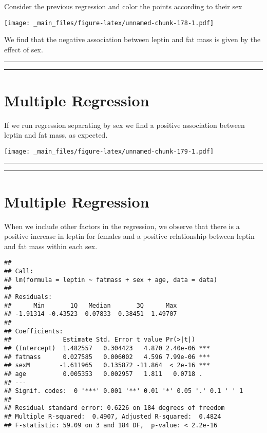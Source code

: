 \documentclass[
]{book}
\begin{document}
Consider the previous regression and color the points according to their sex

\texttt{[image: \_main\_files/figure-latex/unnamed-chunk-178-1.pdf]}

We find that the negative association between leptin and fat mass is given by the effect of sex.

\begin{center}\rule{0.5\linewidth}{0.5pt}\end{center}

\begin{center}\rule{0.5\linewidth}{0.5pt}\end{center}

\hypertarget{multiple-regression-3}{%
\section{Multiple Regression}\label{multiple-regression-3}}

If we run regression separating by sex we find a positive association between leptin and fat mass, as expected.

\texttt{[image: \_main\_files/figure-latex/unnamed-chunk-179-1.pdf]}

\begin{center}\rule{0.5\linewidth}{0.5pt}\end{center}

\begin{center}\rule{0.5\linewidth}{0.5pt}\end{center}

\hypertarget{multiple-regression-4}{%
\section{Multiple Regression}\label{multiple-regression-4}}

When we include other factors in the regression, we observe that there is a positive increase in leptin for females and a positive relationship between leptin and fat mass within each sex.

\begin{verbatim}
## 
## Call:
## lm(formula = leptin ~ fatmass + sex + age, data = data)
## 
## Residuals:
##      Min       1Q   Median       3Q      Max 
## -1.91314 -0.43523  0.07833  0.38451  1.49707 
## 
## Coefficients:
##              Estimate Std. Error t value Pr(>|t|)    
## (Intercept)  1.482557   0.304423   4.870 2.40e-06 ***
## fatmass      0.027585   0.006002   4.596 7.99e-06 ***
## sexM        -1.611965   0.135872 -11.864  < 2e-16 ***
## age          0.005353   0.002957   1.811   0.0718 .  
## ---
## Signif. codes:  0 '***' 0.001 '**' 0.01 '*' 0.05 '.' 0.1 ' ' 1
## 
## Residual standard error: 0.6226 on 184 degrees of freedom
## Multiple R-squared:  0.4907, Adjusted R-squared:  0.4824 
## F-statistic: 59.09 on 3 and 184 DF,  p-value: < 2.2e-16
\end{verbatim}
\end{document}

